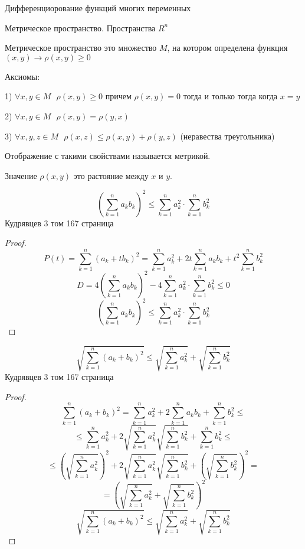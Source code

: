 \begin{title}
  Дифференциорование функций многих переменных
\end{title}

\begin{title}[\Large]
  Метрическое пространство. Пространства $R^n$
\end{title}

\begin{define}
  Метрическое пространство это множество $M$, на котором определена функция
  $(x, y) \to \rho(x, y) \ge 0$

  Аксиомы:

  1) $\forall x,y \in M ~~~ \rho(x,y) \ge 0$ причем $\rho(x,y) = 0$ тогда и
  только тогда когда $x = y$

  2) $\forall x,y \in M ~~~ \rho(x,y) =\rho(y,x)$

  3) $\forall x,y,z \in M ~~~ \rho(x,z) \le \rho(x,y) + \rho(y,z)$
  (неравества треугольника)

  Отображение с такими свойствами называется метрикой.

  Значение $\rho(x,y)$ это растояние между $x$ и $y$.
\end{define}

\begin{block}
  $$
  \left( \sum_{k=1}^n a_k b_k \right)^2 \le \sum_{k=1}^n a_k^2 \cdot
  \sum_{k=1}^n b_k^2
  $$
  Кудрявцев 3 том 167 страница
\end{block}

\begin{proof}
  $$
  P(t) = \sum_{k=1}^n (a_k + t b_k)^2 = \sum_{k=1}^n a_k^2 +
  2t\sum_{k=1}^n a_k b_k + t^2 \sum_{k=1}^n b_k^2
  $$
  $$
  D = 4\left( \sum_{k=1}^n a_k b_k \right)^2 - 4\sum_{k=1}^n a_k^2 \cdot
  \sum_{k=1}^n b_k^2 \le 0
  $$
  $$
  \left( \sum_{k=1}^n a_k b_k \right)^2 \le \sum_{k=1}^n a_k^2 \cdot
  \sum_{k=1}^n b_k^2
  $$
\end{proof}

\begin{block}
  $$
  \sqrt{\sum_{k=1}^n (a_k + b_k)^2} \le \sqrt{\sum_{k=1}^n a_k^2} +
  \sqrt{\sum_{k=1}^n b_k^2}
  $$
  Кудрявцев 3 том 167 страница
\end{block}

\begin{proof}
  $$
  \sum_{k=1}^n (a_k + b_k)^2 = \sum_{k=1}^n a_k^2 +
  2\sum_{k=1}^n a_k b_k + \sum_{k=1}^n b_k^2 \le
  $$
  $$
  \le \sum_{k=1}^n a_k^2 + 2\sqrt{\sum_{k=1}^n a_k^2} \sqrt{\sum_{k=1}^n b_k^2}
  + \sum_{k=1}^n b_k^2 \le
  $$
  $$
  \le \left( \sqrt{\sum_{k=1}^n a_k^2} \right)^2 + 2\sqrt{\sum_{k=1}^n a_k^2}
  \sqrt{\sum_{k=1}^n b_k^2} + \left( \sqrt{\sum_{k=1}^n b_k^2} \right)^2 =
  $$
  $$
  = \left( \sqrt{\sum_{k=1}^n a_k^2} + \sqrt{\sum_{k=1}^n b_k^2} \right)^2
  $$
  $$
  \sqrt{\sum_{k=1}^n (a_k + b_k)^2} \le \sqrt{\sum_{k=1}^n a_k^2} +
  \sqrt{\sum_{k=1}^n b_k^2}
  $$
\end{proof}

